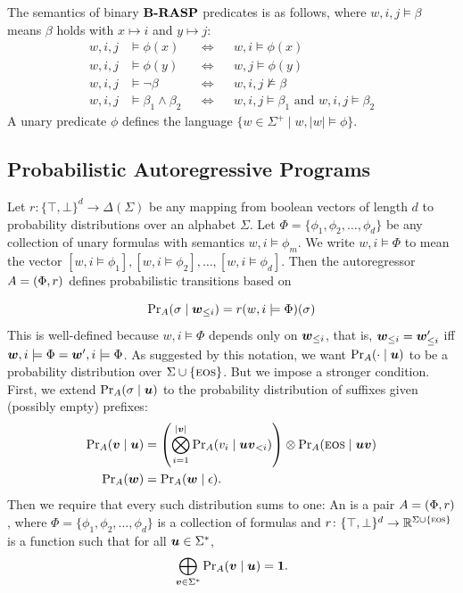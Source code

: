 \documentclass[acmsmall,screen,review,anonymous,nonacm]{PLDI/acmart}
\begin{document}
The semantics of binary $\brasp$ predicates is as follows, where $w,i,j\models\beta$ means $\beta$ holds with $x\mapsto i$ and $y\mapsto j$:
\begin{align*}
    w,i,j&\models \phi(x) &&\iff && w,i\models \phi(x)\\
    w,i,j&\models \phi(y) &&\iff && w,j\models \phi(y)\\
    w,i,j&\models \lnot \beta &&\iff && w,i,j\not\models \beta\\
    w,i,j&\models \beta_1\land \beta_2 &&\iff && w,i,j\models \beta_1 \text{ and } w,i,j\models \beta_2
\end{align*}
A unary predicate $\phi$ defines the language $\{w\in\Sigma^+ \mid w,|w|\models\phi\}$.

\subsection{Probabilistic Autoregressive Programs}

Let $r\colon \{\top,\bot\}^d\to \Delta(\Sigma)$ be any mapping from boolean vectors of length $d$ to probability distributions over an alphabet $\Sigma$.
Let $\Phi=\{\phi_1,\phi_2,\ldots,\phi_d\}$ be any collection of unary formulas with semantics $w,i\models \phi_m$. 
We write $w,i\models \Phi$ to mean the vector $[w,i\models \phi_1],[w,i\models \phi_2],\ldots, [w,i\models \phi_d]$.
Then the autoregressor $\autoregressor=(\Phi,r)$ defines probabilistic transitions based on

\[\sufprob{\autoregressor}{\str_{\le i}}{\sym} = \arout(w,i\models\Phi)(\sym)\]
This is well-defined because $w,i\models \Phi$ depends only on $\str_{\le i}$, that is, $\str_{\le i} = \str'_{\le i} $ iff $\str,i\models\Phi = \str',i\models \Phi$.
As suggested by this notation, we want 
$\symprob{\autoregressor}{\stru}{\mathord\cdot}$ to be a probability distribution over $\alphabet\cup\{\eos\}$. But we impose a stronger condition.  First, we extend $\symprob{\autoregressor}{\stru}{\sym}$ to the probability distribution of suffixes given (possibly empty) prefixes:
\begin{align}
\sufprob{\autoregressor}{\stru}{\strv}&=\left(\bigotimes_{i=1}^{|\strv|}\symprob{\autoregressor}{\stru \strv_{<i}}{v_{i}}\right)\otimes\symprob{\autoregressor}{\stru\strv}{\eos} \label{eq:sufprob} \\
\strprob{\autoregressor}{\str}&=\sufprob{\autoregressor}{\epsilon}{\str}.
\end{align}
Then we require that every such distribution sums to one:
An  is a pair $\autoregressor = (\Phi, \arout)$, where $\Phi = \{\phi_1,\phi_2,\ldots,\phi_d\}$ is a collection of formulas and $\arout \colon \{\top,\bot\}^d \to \R^{\alphabet\cup\{\eos\}}$ is a function such that for all $\stru \in \alphabet^*$, 
\begin{equation}
\bigoplus_{\strv \in \alphabet^*} \sufprob{\autoregressor}{\stru}{\strv} = \one. \label{eq:suffix_probability}
\end{equation}
\end{document}
